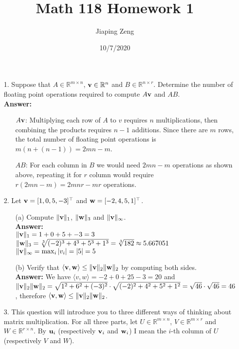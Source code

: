 \documentclass{article}
\title{Math 118 Homework 1}
\date{10/7/2020}
\author{Jiaping Zeng}
\newcommand{\bu}{{\bf u}}
\newcommand{\bv}{{\bf v}}
\newcommand{\bw}{{\bf w}}
\begin{document}
\maketitle

\begin{itemize}
    \item [1.] Suppose that $A\in\mathbb{R}^{m\times n}$, $\bv\in\mathbb{R}^{n}$ and $B\in\mathbb{R}^{n\times r}$. Determine the number of floating point operations required to compute $A\bv$ and $AB$.\\
          \textbf{Answer: } \begin{itemize}
              \item [$A\bv$:] Multiplying each row of $A$ to $v$ requires $n$ multiplications, then combining the products requires $n-1$ additions. Since there are $m$ rows, the total number of floating point operations is $m(n+(n-1))=2mn-m$.
              \item [$AB$:] For each column in $B$ we would need $2mn-m$ operations as shown above, repeating it for $r$ column would require $r(2mn-m)=2mnr-mr$ operations.
          \end{itemize}
    \item [2.] Let $\bv = [1,0,5,-3]^{\top}$ and $\bw = [-2,4,5,1]^{\top}$.
          \begin{itemize}
              \item [(a)] Compute $\|\bv\|_1$, $\|\bw\|_{3}$ and $\|\bv\|_{\infty}$.\\
                    \textbf{Answer: }\\
                    $\|\bv\|_1=1+0+5+-3=3$\\
                    $\|\bw\|_{3}=\sqrt[3]{(-2)^3+4^3+5^3+1^3}=\sqrt[3]{182}\approx 5.667051$\\
                    $\|\bv\|_{\infty}=\max_i\abs{v_i}=\abs{5}=5$
              \item [(b)] Verify that $\langle\bv,\bw\rangle \leq \|\bv\|_2\|\bw\|_2$ by computing both sides.\\
                    \textbf{Answer: } We have $\langle v,w\rangle=-2+0+25-3=20$ and $\|\bv\|_2\|\bw\|_2=\sqrt{1^2+6^2+(-3)^2}\cdot\sqrt{(-2)^2+4^2+5^2+1^2}=\sqrt{46}\cdot\sqrt{46}=46$, therefore $\langle\bv,\bw\rangle \leq \|\bv\|_2\|\bw\|_2$.
          \end{itemize}
    \item [3.] This question will introduce you to three different ways of thinking about matrix multiplication. For all three parts, let $U\in\mathbb{R}^{m\times n}$, $V\in\mathbb{R}^{m\times r}$ and $W\in\mathbb{R}^{r\times n}$. By $\bu_i$ (respectively $\bv_i$ and $\bw_i$) I mean the $i$-th column of $U$ (respectively $V$ and $W$).

\end{itemize}
\end{document}

